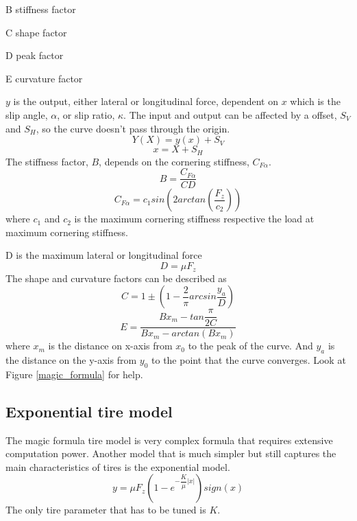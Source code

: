 B stiffness factor

C shape factor

D peak factor

E curvature factor

$ y $ is the output, either lateral or longitudinal force, dependent on $ x $ which is the slip angle, $ \alpha $, or slip ratio, $ \kappa $. The input and output can be affected by a offset, $ S_{V} $ and $ S_{H} $, so the curve doesn't pass through the origin.
\begin{equation}
	Y(X) = y(x) + S_{V}
\end{equation}
\begin{equation}
	x = X + S_{H}
\end{equation}
The stiffness factor, $ B $, depends on the cornering stiffness, $ C_{F\alpha} $.
\begin{equation}
	B = \dfrac{C_{F\alpha}}{CD}
\end{equation}
\begin{equation}
	C_{F\alpha} = c_{1}sin(2arctan(\dfrac{F_{z}}{c_{2}}))
\end{equation}
where $ c_{1} $ and $ c_{2} $ is the maximum cornering stiffness respective the load at maximum cornering stiffness.

D is the maximum lateral or longitudinal force
\begin{equation}
	D = \mu F_{z}
\end{equation}
The shape and curvature factors can be described as
\begin{equation}
	C = 1 \pm (1 - \dfrac{2}{\pi}arcsin\dfrac{y_{a}}{D})
\end{equation}
\begin{equation}
	E = \dfrac{Bx_{m} - tan{\dfrac{\pi}{2C}}}{Bx_{m} - arctan(Bx_{m})}
\end{equation}
where $ x_{m} $ is the distance on x-axis from $ x_{0} $ to the peak of the curve. And $ y_{a} $ is the distance on the y-axis from $ y_{0} $ to the point that the curve converges. Look at Figure \ref{magic_formula} for help.

\subsection{Exponential tire model}

The magic formula tire model is very complex formula that requires extensive computation power. Another model that is much simpler but still captures the main characteristics of tires is the exponential model. 
\begin{equation}
	y = \mu F_{z} (1 - e^{-\dfrac{K}{\mu}|x|} )sign(x)
\end{equation}
The only tire parameter that has to be tuned is $ K $.

